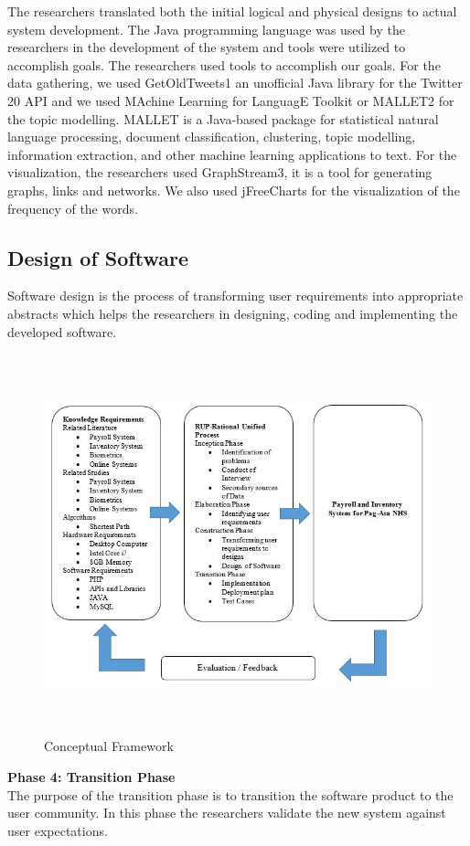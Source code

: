The researchers translated both the initial logical and physical designs to actual system development. The Java programming language was used by the researchers in the development of the system and tools were utilized to accomplish goals. The researchers used tools to accomplish our goals. For the data gathering, we used GetOldTweets1 an unofficial Java library for the Twitter 20 API and we used MAchine Learning for LanguagE Toolkit or MALLET2 for the topic modelling. MALLET is a Java-based package for statistical natural language processing, document classification, clustering, topic modelling, information extraction, and other machine learning applications to text. For the visualization, the researchers used GraphStream3, it is a tool for generating graphs, links and networks. We also used jFreeCharts for the visualization of the frequency of the words.

\subsection{Design of Software}
\vspace{-2ex}Software design is the process of transforming user requirements into appropriate abstracts which helps the researchers in designing, coding and implementing the developed software.

\begin{figure}[H]
	\centering
	\caption{Conceptual Framework}
	\includegraphics[width=15cm,height=11cm]{image/3-3.jpg}
\end{figure}
\noindent\textbf{Phase 4: Transition Phase}\\
\hspace*{1.5cm}The purpose of the transition phase is to transition the software product to the user community. In this phase the researchers validate the new system against user expectations. 
	
